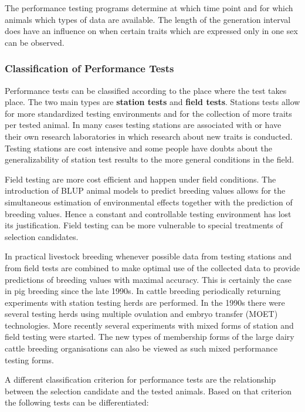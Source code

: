 \documentclass[
]{book}
\begin{document}
The performance testing programs determine at which time point and for which animals which types of data are available. The length of the generation interval does have an influence on when certain traits which are expressed only in one sex can be observed.

\hypertarget{gel-bprog-classperftest}{%
\subsubsection{Classification of Performance Tests}\label{gel-bprog-classperftest}}

Performance tests can be classified according to the place where the test takes place. The two main types are \textbf{station tests} and \textbf{field tests}. Stations tests allow for more standardized testing environments and for the collection of more traits per tested animal. In many cases testing stations are associated with or have their own research laboratories in which research about new traits is conducted. Testing stations are cost intensive and some people have doubts about the generalizability of station test results to the more general conditions in the field.

Field testing are more cost efficient and happen under field conditions. The introduction of BLUP animal models to predict breeding values allows for the simultaneous estimation of environmental effects together with the prediction of breeding values. Hence a constant and controllable testing environment has lost its justification. Field testing can be more vulnerable to special treatments of selection candidates.

In practical livestock breeding whenever possible data from testing stations and from field tests are combined to make optimal use of the collected data to provide predictions of breeding values with maximal accuracy. This is certainly the case in pig breeding since the late 1990s. In cattle breeding periodically returning experiments with station testing herds are performed. In the 1990s there were several testing herds using multiple ovulation and embryo transfer (MOET) technologies. More recently several experiments with mixed forms of station and field testing were started. The new types of membership forms of the large dairy cattle breeding organisations can also be viewed as such mixed performance testing forms.

A different classification criterion for performance tests are the relationship between the selection candidate and the tested animals. Based on that criterion the following tests can be differentiated:
\end{document}
